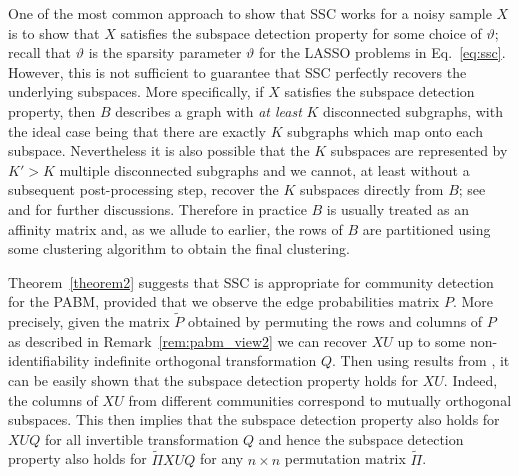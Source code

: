 \documentclass[12pt]{article}
\begin{document}
\begin{remark}
One of the most common approach to show that SSC works for a noisy
sample $X$ is to show that 
$X$ satisfies the
subspace detection property for some choice of $\vartheta$; recall
that $\vartheta$ is the sparsity parameter $\vartheta$ for
the LASSO problems in Eq.~\eqref{eq:ssc}. However, this is not sufficient to
guarantee that SSC perfectly recovers the underlying subspaces.
More specifically, if $X$ satisfies the 
subspace detection property, 
then $B$ describes a graph with {\em at least} $K$ disconnected subgraphs, 
with the ideal case being that there are exactly $K$ subgraphs 
which map onto each subspace. 
Nevertheless it is also possible that the $K$ subspaces are represented by
$K' > K$
multiple disconnected subgraphs and we cannot, at least without a subsequent
post-processing step, recover the $K$ subspaces directly from $B$;
see \citet{sdp_sufficiency} and \citet{liu_ssc}
for further discussions. Therefore in practice $B$ is usually treated as an
affinity matrix and, as we allude to earlier, 
the rows of $B$ are partitioned using some
clustering algorithm to obtain the final clustering. 
\end{remark}

Theorem~\ref{theorem2} suggests that SSC is appropriate for community
detection for the PABM, provided that we observe the edge probabilities
matrix $P$. More precisely, given the matrix $\tilde{P}$ obtained by
permuting the rows and columns of $P$ as described in
Remark~\ref{rem:pabm_view2} we can recover $XU$ up
to some non-identifiability indefinite orthogonal transformation $Q$. 
Then using results from \citet{soltanolkotabi2012}, it can be easily shown
that the subspace detection property holds for \(XU\). Indeed, the columns
of \(XU\) from different communities correspond to mutually
orthogonal subspaces. This then implies that the
subspace detection property also holds for $XUQ$ for all invertible
transformation $Q$ and hence the subspace detection property also holds for
$\tilde{\Pi} X U Q$ for any $n \times n$ permutation matrix $\tilde{\Pi}$. 
\end{document}
